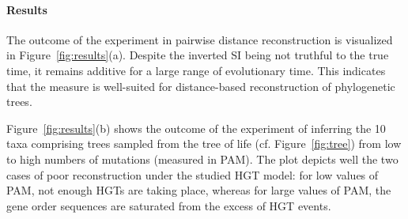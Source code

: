 \documentclass[9pt,english,utf8]{article}
\begin{document}
\paragraph{Results} The outcome of the experiment in pairwise distance
reconstruction is visualized in Figure~\ref{fig:results}(a). Despite the
inverted SI being not truthful to the true time, it remains additive for a
large range of evolutionary time. This indicates that the measure is
well-suited for distance-based reconstruction of phylogenetic trees. 

Figure~\ref{fig:results}(b) shows the outcome of the experiment of inferring
the 10 taxa comprising trees sampled from the tree of life (cf.
Figure~\ref{fig:tree}) from low to high numbers of mutations (measured in PAM).
The plot depicts well the two cases of poor reconstruction under the studied
HGT model: for low values of PAM, not enough HGTs are taking place, whereas for
large values of PAM, the gene order sequences are saturated from the excess of
HGT events. 
\end{document}
